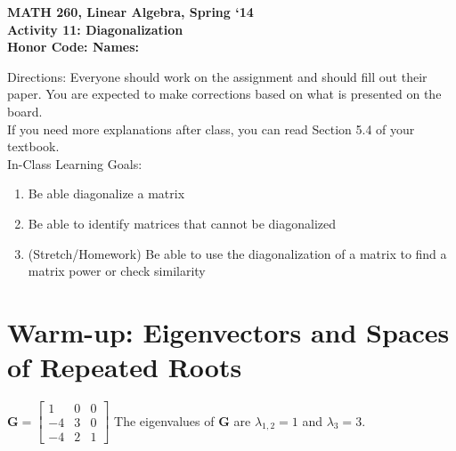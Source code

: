 \documentclass{article}
\begin{document}
\begin{flushleft}
	\bfseries{MATH 260, Linear Algebra, Spring `14}\\
	\bfseries{Activity 11:  Diagonalization}\\
	\bfseries{Honor Code:} \hspace{3.5in}\bfseries{Names:}\\
\end{flushleft}
\begin{flushleft}
\vspace{.75in}
Directions:  Everyone should work on the assignment and should fill out their paper.  You are expected to make corrections based on what is presented on the board.  \\
If you need more explanations after class, you can read Section 5.4 of your textbook.\\
\vspace{0.1in}
\Large
In-Class Learning Goals:\\
\normalsize
\begin{enumerate}
\item Be able diagonalize a matrix
\item Be able to identify matrices that cannot be diagonalized
\item (Stretch/Homework) Be able to use the diagonalization of a matrix to find a matrix power or check similarity

\end{enumerate}

\vspace{0.1in}

\section*{Warm-up:  Eigenvectors and Spaces of Repeated Roots}

$\textbf{G}
=\begin{bmatrix}
1 & 0 & 0\\
-4 & 3 & 0 \\
-4 & 2 & 1
\end{bmatrix}
$
\hspace{0.5in}
The eigenvalues of \textbf{G} are $\lambda_{1,2}=1$ and $\lambda_3 = 3$. 


\end{flushleft}
\end{document}
